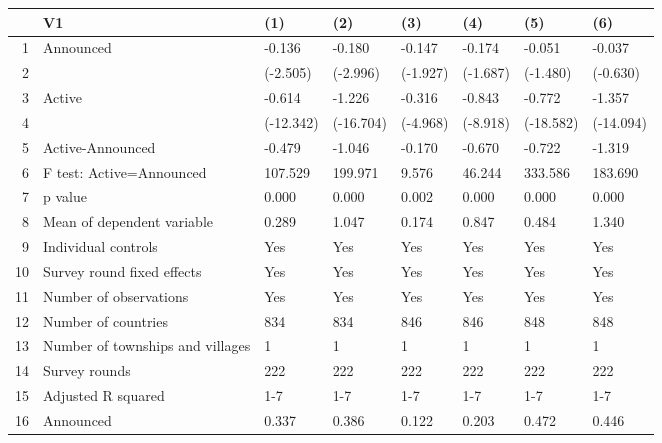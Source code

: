 \begin{table}[ht]
\centering
\begin{tabular}{rlllllll}
  \hline
 & V1 & (1) & (2) & (3) & (4) & (5) & (6) \\ 
  \hline
1 & Announced & -0.136 & -0.180 & -0.147 & -0.174 & -0.051 & -0.037 \\ 
  2 &  & (-2.505) & (-2.996) & (-1.927) & (-1.687) & (-1.480) & (-0.630) \\ 
  3 & Active & -0.614 & -1.226 & -0.316 & -0.843 & -0.772 & -1.357 \\ 
  4 &  & (-12.342) & (-16.704) & (-4.968) & (-8.918) & (-18.582) & (-14.094) \\ 
  5 & Active-Announced & -0.479 & -1.046 & -0.170 & -0.670 & -0.722 & -1.319 \\ 
  6 & F test: Active=Announced & 107.529 & 199.971 & 9.576 & 46.244 & 333.586 & 183.690 \\ 
  7 & p value & 0.000 & 0.000 & 0.002 & 0.000 & 0.000 & 0.000 \\ 
  8 & Mean of dependent variable & 0.289 & 1.047 & 0.174 & 0.847 & 0.484 & 1.340 \\ 
  9 & Individual controls & Yes & Yes & Yes & Yes & Yes & Yes \\ 
  10 & Survey round fixed effects & Yes & Yes & Yes & Yes & Yes & Yes \\ 
  11 & Number of observations & Yes & Yes & Yes & Yes & Yes & Yes \\ 
  12 & Number of countries & 834 & 834 & 846 & 846 & 848 & 848 \\ 
  13 & Number of townships and villages & 1 & 1 & 1 & 1 & 1 & 1 \\ 
  14 & Survey rounds & 222 & 222 & 222 & 222 & 222 & 222 \\ 
  15 & Adjusted R squared & 1-7 & 1-7 & 1-7 & 1-7 & 1-7 & 1-7 \\ 
  16 & Announced & 0.337 & 0.386 & 0.122 & 0.203 & 0.472 & 0.446 \\ 
   \hline
\end{tabular}
\end{table}
